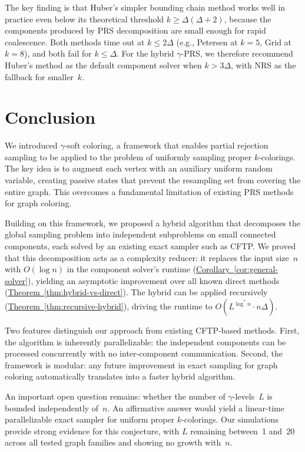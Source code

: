 \documentclass[12pt, a4paper]{article}
\theoremstyle{plain}
\theoremstyle{definition}
\theoremstyle{remark}
\newcommand{\sref}[2]{\hyperref[#2]{#1~\ref*{#2}}}
\begin{document}
The key finding is that Huber's simpler bounding chain method works well in practice even below its theoretical threshold \(k\geq\Delta(\Delta+2)\), because the components produced by PRS decomposition are small enough for rapid coalescence. Both methods time out at \(k\leq 2\Delta\) (e.g., Petersen at \(k=5\), Grid at \(k=8\)), and both fail for \(k\leq\Delta\). For the hybrid \(\gamma\)-PRS, we therefore recommend Huber's method as the default component solver when \(k>3\Delta\), with NRS as the fallback for smaller~\(k\).

\section{Conclusion}\label{sec:conclusion}

We introduced \(\gamma\)-soft coloring, a framework that enables partial rejection sampling to be applied to the problem of uniformly sampling proper \(k\)-colorings. The key idea is to augment each vertex with an auxiliary uniform random variable, creating passive states that prevent the resampling set from covering the entire graph. This overcomes a fundamental limitation of existing PRS methods for graph coloring.

Building on this framework, we proposed a hybrid algorithm that decomposes the global sampling problem into independent subproblems on small connected components, each solved by an existing exact sampler such as CFTP. We proved that this decomposition acts as a complexity reducer: it replaces the input size~\(n\) with \(O(\log n)\) in the component solver's runtime (\sref{Corollary}{cor:general-solver}), yielding an asymptotic improvement over all known direct methods (\sref{Theorem}{thm:hybrid-vs-direct}). The hybrid can be applied recursively (\sref{Theorem}{thm:recursive-hybrid}), driving the runtime to \(O(L^{\log^* n}\cdot n\Delta)\).

Two features distinguish our approach from existing CFTP-based methods. First, the algorithm is inherently parallelizable: the independent components can be processed concurrently with no inter-component communication. Second, the framework is modular: any future improvement in exact sampling for graph coloring automatically translates into a faster hybrid algorithm.

An important open question remains: whether the number of \(\gamma\)-levels~\(L\) is bounded independently of~\(n\). An affirmative answer would yield a linear-time parallelizable exact sampler for uniform proper \(k\)-colorings. Our simulations provide strong evidence for this conjecture, with \(L\) remaining between~1 and~20 across all tested graph families and showing no growth with~\(n\).
\end{document}
